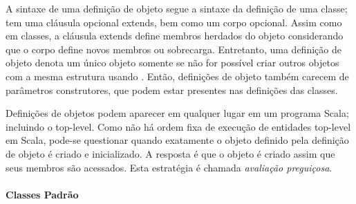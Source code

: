 A sintaxe de uma defini\c{c}\~{a}o de objeto segue a sintaxe da defini\c{c}\~{a}o de uma 
classe; tem uma cl\'{a}usula opcional extends, bem como um corpo opcional. 
Assim como em classes, a cl\'{a}usula extends define membros herdados do objeto 
considerando que o corpo define novos membros ou sobrecarga. Entretanto, uma 
defini\c{c}\~{a}o de objeto denota um \'{u}nico objeto somente se n\~{a}o for poss\'{i}vel criar
outros objetos com a mesma estrutura usando . Ent\~{a}o, defini\c{c}\~{o}es de
objeto tamb\'{e}m carecem de par\^{a}metros construtores, que podem estar presentes
nas defini\c{c}\~{o}es das classes.

Defini\c{c}\~{o}es de objetos podem aparecer em qualquer lugar em um programa Scala;
incluindo o top-level. Como n\~{a}o h\'{a} ordem fixa de execu\c{c}\~{a}o de entidades
top-level em Scala, pode-se questionar quando exatamente o objeto definido 
pela defini\c{c}\~{a}o de objeto \'{e} criado e inicializado. A resposta \'{e} que o objeto 
\'{e} criado assim que seus membros s\~{a}o acessados. Esta estrat\'{e}gia \'{e} chamada 
{\em avalia\c{c}\~{a}o pregui\c{c}osa}.

\paragraph{Classes Padr\~{a}o}

